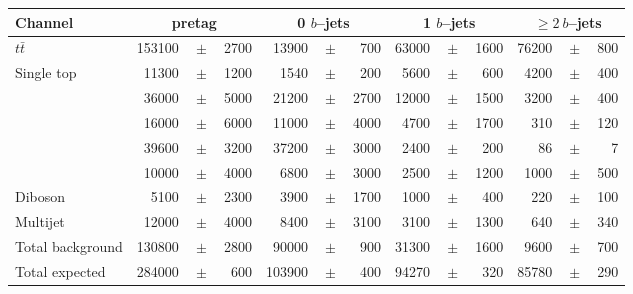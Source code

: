 \begin{table}
  \begin{tabular}{ l  rrr  rrr  rrr  rrr }
    \toprule
    Channel & \multicolumn{3}{c}{\ejets{} pretag} &
    \multicolumn{3}{c}{\ejets{} 0 $b$--jets} &
    \multicolumn{3}{c}{\ejets{} 1 $b$--jets} & \multicolumn{3}{c}{\ejets{} $\geq2~b$--jets} \\
    \midrule
    $t\bar{t}$            & 153100 &$\!\!\!\pm\!\!\!$& 2700   & 13900 &$\!\!\!\pm\!\!\!$& 700   & 63000 &$\!\!\!\pm\!\!\!$& 1600   & 76200 &$\!\!\!\pm\!\!\!$& 800  \\ 
    Single top            & 11300  &$\!\!\!\pm\!\!\!$& 1200   & 1540 &$\!\!\!\pm\!\!\!$& 200    & 5600 &$\!\!\!\pm\!\!\!$& 600     & 4200 &$\!\!\!\pm\!\!\!$& 400  \\
    \wbb{}                & 36000  &$\!\!\!\pm\!\!\!$& 5000   & 21200 &$\!\!\!\pm\!\!\!$& 2700  & 12000 &$\!\!\!\pm\!\!\!$& 1500   & 3200 &$\!\!\!\pm\!\!\!$& 400  \\
    \wc{}                 & 16000  &$\!\!\!\pm\!\!\!$& 6000   & 11000 &$\!\!\!\pm\!\!\!$& 4000  & 4700 &$\!\!\!\pm\!\!\!$& 1700    & 310 &$\!\!\!\pm\!\!\!$& 120\\
    \wlight{}             & 39600  &$\!\!\!\pm\!\!\!$& 3200   & 37200 &$\!\!\!\pm\!\!\!$& 3000  & 2400 &$\!\!\!\pm\!\!\!$& 200     & 86 &$\!\!\!\pm\!\!\!$& 7     \\ 
    \zjets{}              & 10000  &$\!\!\!\pm\!\!\!$& 4000   & 6800 &$\!\!\!\pm\!\!\!$& 3000   & 2500 &$\!\!\!\pm\!\!\!$& 1200    & 1000 &$\!\!\!\pm\!\!\!$& 500\\
    Diboson               & 5100   &$\!\!\!\pm\!\!\!$& 2300   & 3900 &$\!\!\!\pm\!\!\!$& 1700   & 1000 &$\!\!\!\pm\!\!\!$& 400     & 220 &$\!\!\!\pm\!\!\!$& 100   \\ 
    Multijet              & 12000  &$\!\!\!\pm\!\!\!$& 4000   & 8400 &$\!\!\!\pm\!\!\!$& 3100   & 3100 &$\!\!\!\pm\!\!\!$& 1300    & 640 &$\!\!\!\pm\!\!\!$& 340 \\
    \midrule                                                                                                                                            
    Total background      & 130800 &$\!\!\!\pm\!\!\!$& 2800   & 90000 &$\!\!\!\pm\!\!\!$& 900   & 31300 &$\!\!\!\pm\!\!\!$& 1600   & 9600 &$\!\!\!\pm\!\!\!$& 700  \\
    \midrule                                                                                                                                                
    Total expected        & 284000 &$\!\!\!\pm\!\!\!$& 600    & 103900 &$\!\!\!\pm\!\!\!$& 400  & 94270 &$\!\!\!\pm\!\!\!$& 320    & 85780 &$\!\!\!\pm\!\!\!$& 290 \\

\end{tabular}
\end{table}
